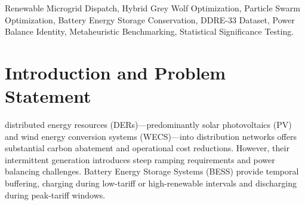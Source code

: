 \documentclass[journal,10pt,twocolumn]{IEEEtran}
\begin{document}
\begin{abstract}
Optimal load dispatch in modern renewable microgrids requires coordinated scheduling of intermittent distributed generation (DG) assets, electrochemical energy storage systems, and utility grid interconnections under dynamic time-of-use (TOU) tariffs. This technical report presents the comprehensive mathematical formulation, algorithmic architecture, software implementation, and empirical verification of GridBalance---a research-grade microgrid economic dispatch optimization framework. Authentic solar photovoltaic (PV) and distributed wind power time-series from the Nature Scientific Data DDRE-33 dataset (mapped to the standard IEEE 33-bus radial distribution network) are integrated with a 2.0 MWh Lithium-Iron-Phosphate (LFP) Battery Energy Storage System (BESS). To resolve the non-convex dispatch problem, we benchmark Particle Swarm Optimization (PSO), Grey Wolf Optimizer (GWO), a Genetic Algorithm (GA), and an adaptive Hybrid GWO--PSO engine across 10 random seeds (40 total benchmark runs, $N=30$, $K=100$). The model incorporates a cyclic terminal battery State of Charge (SOC) constraint ($|\text{SOC}(24) - \text{SOC}(0)| \le 1.0\%$) to prevent artificial energy depletion, and an explicit power balance formulation tracking unserved load and excess generation without silent clipping. Results demonstrate that all 40 runs achieve 100.0\% physical feasibility with zero unserved energy and machine-precision power balance ($|\text{residual}| \le 2.27 \times 10^{-13}$ kW). Hybrid GWO--PSO achieves superior stability (standard deviation \$45.09 vs \$82.47 for PSO) and statistically significant cost reduction over standalone GWO (Welch's $t = -3.505$, $p = 0.0031$; Mann-Whitney $U = 9.0$, $p = 0.0022$), providing an average daily operational saving of \$97.68.
\end{abstract}

\begin{IEEEkeywords}
Renewable Microgrid Dispatch, Hybrid Grey Wolf Optimization, Particle Swarm Optimization, Battery Energy Storage Conservation, DDRE-33 Dataset, Power Balance Identity, Metaheuristic Benchmarking, Statistical Significance Testing.
\end{IEEEkeywords}

\section{Introduction and Problem Statement}
 distributed energy resources (DERs)---predominantly solar photovoltaics (PV) and wind energy conversion systems (WECS)---into distribution networks offers substantial carbon abatement and operational cost reductions. However, their intermittent generation introduces steep ramping requirements and power balancing challenges. Battery Energy Storage Systems (BESS) provide temporal buffering, charging during low-tariff or high-renewable intervals and discharging during peak-tariff windows.
\end{document}
